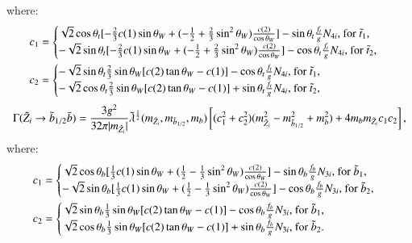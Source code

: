 \documentclass[final,3p,times,pdflatex]{elsarticle}
\begin{document}
where:
\begin{align}
c_{1} &= \begin{cases}
		\sqrt{2}\cos\theta_t[-{2 \over 3}c(1) \sin\theta_W + (-{1 \over 2} + {2 \over 3}\sin^2 \theta_W){c(2) \over \cos\theta_W}] - \sin\theta_t {f_{t} \over g} N_{4i} $, for $\tilde{t}_1$,$ \\
		-\sqrt{2}\sin\theta_t[-{2 \over 3}c(1) \sin\theta_W + (-{1 \over 2} + {2 \over 3}\sin^2 \theta_W){c(2) \over \cos\theta_W}] - \cos\theta_t {f_{t} \over g}N_{4i} $, for $\tilde{t}_2$,$ \\
		\end{cases} \\
c_{2} &= \begin{cases}
		-\sqrt{2}\sin\theta_t{2 \over 3}\sin\theta_W [c(2)\tan\theta_W - c(1)] - \cos\theta_t {f_{t} \over g} N_{4i} $, for $\tilde{t}_1$,$ \\
		-\sqrt{2}\cos\theta_t{2 \over 3}\sin\theta_W [c(2)\tan\theta_W - c(1)] + \sin\theta_t {f_{t} \over g} N_{4i} $, for $\tilde{t}_2$,$ \\
		\end{cases}
\end{align}
\begin{equation} \label{neutsbbNMSSM}
\Gamma(\tilde{Z}_i \rightarrow \tilde{b}_{1/2} \bar{b}) = {3 g^2 \over 32\pi |m_{\tilde{Z}_i}|} \tilde{\lambda}^{1 \over 2}(m_{\tilde{Z}_i},m_{\tilde{b}_{1/2}}, m_{b})\left[(c_{1}^2 + c_{2}^2)(m_{\tilde{Z}_i}^2 - m_{\tilde{b}_{1/2}}^2 + m_{b}^2) + 4m_{b}m_{\tilde{Z}_i}c_{1}c_{2}\right],
\end{equation}
where:
\begin{align}
c_{1} &= \begin{cases}
		\sqrt{2}\cos\theta_b [{1 \over 3}c(1) \sin\theta_W + ({1 \over 2} - {1 \over 3}\sin^2 \theta_W){c(2) \over \cos\theta_W}] - \sin\theta_b {f_{b} \over g} N_{3i} $, for $\tilde{b}_1$,$ \\
		-\sqrt{2}\sin\theta_b[{1 \over 3}c(1) \sin\theta_W + ({1 \over 2} - {1 \over 3}\sin^2 \theta_W){c(2) \over \cos\theta_W}] - \cos\theta_b {f_{b} \over g}N_{3i} $, for $\tilde{b}_2$,$ \\
		\end{cases} \\
c_{2} &= \begin{cases}
		\sqrt{2}\sin\theta_b{1 \over 3}\sin\theta_W [c(2)\tan\theta_W - c(1)] - \cos\theta_b {f_{b} \over g} N_{3i} $, for $\tilde{b}_1$,$ \\
		\sqrt{2}\cos\theta_b{1 \over 3}\sin\theta_W [c(2)\tan\theta_W - c(1)] + \sin\theta_b {f_{b} \over g} N_{3i} $, for $\tilde{b}_2. \\
		\end{cases}
\end{align}
\end{document}
